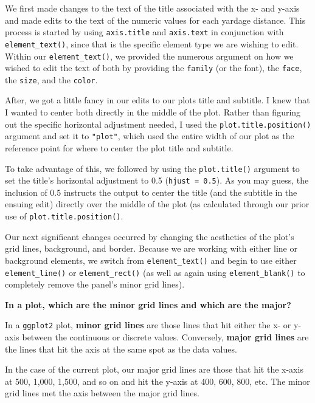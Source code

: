 \documentclass[
  letterpaper,
]{krantz}
\begin{document}
We first made changes to the text of the title associated with the x-
and y-axis and made edits to the text of the numeric values for each
yardage distance. This process is started by using \texttt{axis.title}
and \texttt{axis.text} in conjunction with \texttt{element\_text()},
since that is the specific element type we are wishing to edit. Within
our \texttt{element\_text()}, we provided the numerous argument on how
we wished to edit the text of both by providing the \texttt{family} (or
the font), the \texttt{face}, the \texttt{size}, and the \texttt{color}.

After, we got a little fancy in our edits to our plots title and
subtitle. I knew that I wanted to center both directly in the middle of
the plot. Rather than figuring out the specific horizontal adjustment
needed, I used the \texttt{plot.title.position()} argument and set it to
\texttt{"plot"}, which used the entire width of our plot as the
reference point for where to center the plot title and subtitle.

To take advantage of this, we followed by using the
\texttt{plot.title()} argument to set the title's horizontal adjustment
to 0.5 (\texttt{hjust\ =\ 0.5}). As you may guess, the inclusion of 0.5
instructs the output to center the title (and the subtitle in the
ensuing edit) directly over the middle of the plot (as calculated
through our prior use of \texttt{plot.title.position()}.

Our next significant changes occurred by changing the aesthetics of the
plot's grid lines, background, and border. Because we are working with
either line or background elements, we switch from
\texttt{element\_text()} and begin to use either
\texttt{element\_line()} or \texttt{element\_rect()} (as well as again
using \texttt{element\_blank()} to completely remove the panel's minor
grid lines).

\begin{tcolorbox}[enhanced jigsaw, left=2mm, toprule=.15mm, opacitybacktitle=0.6, leftrule=.75mm, bottomrule=.15mm, colbacktitle=quarto-callout-tip-color!10!white, breakable, colback=white, bottomtitle=1mm, toptitle=1mm, title=\textcolor{quarto-callout-tip-color}{\faLightbulb}\hspace{0.5em}{Tip}, coltitle=black, titlerule=0mm, arc=.35mm, opacityback=0, colframe=quarto-callout-tip-color-frame, rightrule=.15mm]

\textbf{In a plot, which are the minor grid lines and which are the
major?}

In a \texttt{ggplot2} plot, \textbf{minor grid lines} are those lines
that hit either the x- or y-axis between the continuous or discrete
values. Conversely, \textbf{major grid lines} are the lines that hit the
axis at the same spot as the data values.

In the case of the current plot, our major grid lines are those that hit
the x-axis at 500, 1,000, 1,500, and so on and hit the y-axis at 400,
600, 800, etc. The minor grid lines met the axis between the major grid
lines.

\end{tcolorbox}
\end{document}
